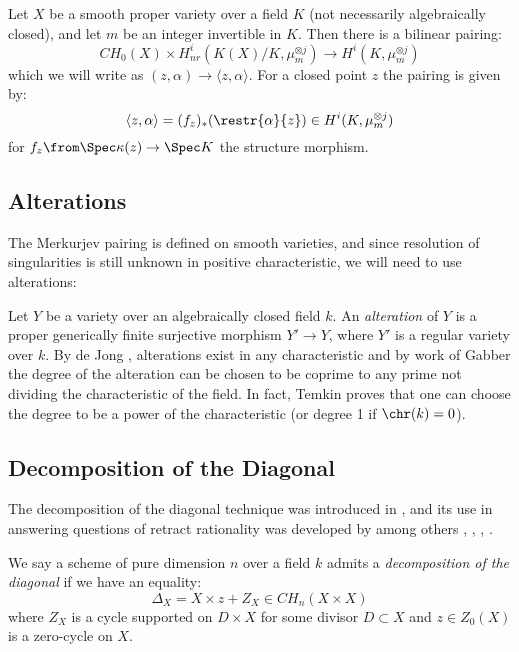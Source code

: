 \begin{proposition}
	\label{prop:MerkurjevPairing}
	Let $X$ be a smooth proper variety over a field $K$ (not necessarily algebraically closed), and let $m$ be an integer invertible in $K$. Then there is a bilinear pairing:
	\[CH_0(X) \times H_{nr}^i(K(X)/K,\mu_m^{\otimes j}) \to H^i(K,\mu_m^{\otimes j})\]
	which we will write as $(z,\alpha) \to \langle z,\alpha \rangle$. For a closed point $z$ the pairing is given by:
	\[\langle z,\alpha \rangle = (f_z)_*(\restr{\alpha}{z}) \in H^i(K,\mu_m^{\otimes j})\]
	for $f_z \from \Spec \kappa(z) \to \Spec K$ the structure morphism.
\end{proposition}

\subsection{Alterations}
The Merkurjev pairing is defined on smooth varieties, and since resolution of singularities is still unknown in positive characteristic, we will need to use alterations:

Let $Y$ be a variety over an algebraically closed field $k$. An \emph{alteration} of $Y$ is a proper generically finite surjective morphism $Y' \to Y$, where $Y'$ is a regular variety over $k$. By de Jong \cite{deJ96}, alterations exist in any characteristic and by work of Gabber the degree of the alteration can be chosen to be coprime to any prime not dividing the characteristic of the field. In fact, Temkin proves that one can choose the degree to be a power of the characteristic \cite[Theorem 1.2.5]{Tem17}(or degree 1 if $\chr(k)=0$).



\subsection{Decomposition of the Diagonal}
The decomposition of the diagonal technique was introduced in \cite{BSCorrespondences}, and its use in answering questions of retract rationality was developed by among others \cite{VoisinDoubleQuartic}, \cite{ColliotThelenePirutka} \cite{Tot16}, \cite{SchreiederHypersurface}, \cite{SchreiederTorsionOrders}.

\begin{definition}
We say a scheme of pure dimension $n$ over a field $k$ admits a \emph{decomposition of the diagonal} if we have an equality:
\[\Delta_X = X \times z  + Z_X \in CH_n(X \times X) \]
where $Z_X$ is a cycle supported on $D \times X$ for some divisor $D \subset X$ and $z \in Z_0(X)$ is a zero-cycle on $X$.
\end{definition}

